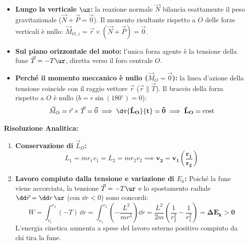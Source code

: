 \begin{tcolorbox}[enhanced, breakable, colback=forestgreen!5!white, colframe=forestgreen!80!black,
    title={\textbf{Analisi delle Forze e dei Momenti Meccanici}}, fonttitle=\bfseries\sffamily]
\begin{itemize}
    \item \textbf{Lungo la verticale $\uz$:} la reazione normale $\vec{N}$ bilancia esattamente il peso gravitazionale ($\vec{N} + \vec{P} = \vec{0}$). Il momento risultante rispetto a $O$ delle forze verticali è nullo: $\vec{M}_{O,z} = \vec{r}\times(\vec{N}+\vec{P}) = \vec{0}$.
    \item \textbf{Sul piano orizzontale del moto:} l'unica forza agente è la tensione della fune $\vec{T} = -T\ur$, diretta verso il foro centrale $O$.
    \item \textbf{Perché il momento meccanico è nullo ($\vec{M}_O = \vec{0}$):} la linea d'azione della tensione coincide con il raggio vettore $\vec{r}$ ($\vec{r} \parallel \vec{T}$). Il braccio della forza rispetto a $O$ è nullo ($b = r\sin(180^\circ) = 0$):
    \begin{equation}
        \vec{M}_O = \vec{r}\times\vec{T} = \vec{0} \implies \mathbf{\dv{\vec{L}_O}{t} = \vec{0} \implies \vec{L}_O = \text{cost}}
    \end{equation}
\end{itemize}
\end{tcolorbox}

\textbf{Risoluzione Analitica:}
\begin{enumerate}
    \item \textbf{Conservazione di $\vec{L}_O$:}
    \begin{equation}
        L_1 = m r_1 v_1 = L_2 = m r_2 v_2 \implies \mathbf{v_2 = v_1\left(\frac{r_1}{r_2}\right)}
    \end{equation}
    \item \textbf{Lavoro compiuto dalla tensione e variazione di $E_k$:}
    Poiché la fune viene accorciata, la tensione $\vec{T} = -T\ur$ e lo spostamento radiale $\dd\vec{r} = \dd r\,\ur$ (con $\dd r < 0$) sono concordi:
    \begin{equation}
        W = \int_{r_1}^{r_2} (-T)\,\dd r = \int_{r_1}^{r_2} \left(-\frac{L^2}{m r^3}\right)\dd r = \frac{L^2}{2m}\left(\frac{1}{r_2^2} - \frac{1}{r_1^2}\right) = \mathbf{\Delta E_k > 0}
    \end{equation}
    L'energia cinetica aumenta a spese del lavoro esterno positivo compiuto da chi tira la fune.
\end{enumerate}
